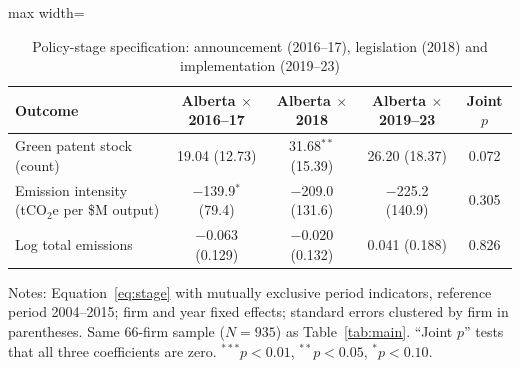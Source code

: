 \begin{table}[htbp]\centering\footnotesize
\caption{Policy-stage specification: announcement (2016--17), legislation (2018) and implementation (2019--23)}
\label{tab:segmented}
\begin{adjustbox}{max width=\textwidth}
\begin{tabular}{lcccc}
\toprule
Outcome & Alberta $\times$ 2016--17 & Alberta $\times$ 2018 & Alberta $\times$ 2019--23 & Joint $p$ \\
\midrule
Green patent stock (count) & 19.04 (12.73) & 31.68$^{**}$ (15.39) & 26.20 (18.37) & 0.072 \\
Emission intensity (tCO$_2$e per \$M output) & $-$139.9$^{*}$ (79.4) & $-$209.0 (131.6) & $-$225.2 (140.9) & 0.305 \\
Log total emissions & $-$0.063 (0.129) & $-$0.020 (0.132) & 0.041 (0.188) & 0.826 \\
\bottomrule
\end{tabular}
\end{adjustbox}
\par\vspace{3pt}\begin{minipage}{\textwidth}\footnotesize
Notes: Equation~\ref{eq:stage} with mutually exclusive period indicators, reference period 2004--2015; firm and year fixed effects; standard errors clustered by firm in parentheses. Same 66-firm sample ($N=935$) as Table~\ref{tab:main}. ``Joint $p$'' tests that all three coefficients are zero. $^{***}p<0.01$, $^{**}p<0.05$, $^{*}p<0.10$.
\end{minipage}
\end{table}
